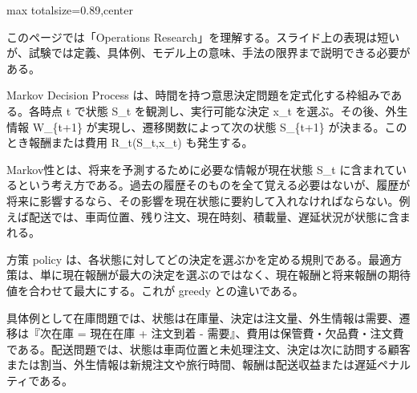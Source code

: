 \begin{minipage}[t]{0.58\textwidth}
\begin{adjustbox}{max totalsize={\textwidth}{0.89\textheight},center}
\begin{minipage}{\textwidth}\scriptsize
{}このページでは「Operations Research」を理解する。スライド上の表現は短いが、試験では定義、具体例、モデル上の意味、手法の限界まで説明できる必要がある。\par
Markov Decision Process は、時間を持つ意思決定問題を定式化する枠組みである。各時点 t で状態 S\_t を観測し、実行可能な決定 x\_t を選ぶ。その後、外生情報 W\_\{t+1\} が実現し、遷移関数によって次の状態 S\_\{t+1\} が決まる。このとき報酬または費用 R\_t(S\_t,x\_t) も発生する。\par
Markov性とは、将来を予測するために必要な情報が現在状態 S\_t に含まれているという考え方である。過去の履歴そのものを全て覚える必要はないが、履歴が将来に影響するなら、その影響を現在状態に要約して入れなければならない。例えば配送では、車両位置、残り注文、現在時刻、積載量、遅延状況が状態に含まれる。\par
方策 policy は、各状態に対してどの決定を選ぶかを定める規則である。最適方策は、単に現在報酬が最大の決定を選ぶのではなく、現在報酬と将来報酬の期待値を合わせて最大にする。これが greedy との違いである。\par
具体例として在庫問題では、状態は在庫量、決定は注文量、外生情報は需要、遷移は『次在庫 = 現在在庫 + 注文到着 - 需要』、費用は保管費・欠品費・注文費である。配送問題では、状態は車両位置と未処理注文、決定は次に訪問する顧客または割当、外生情報は新規注文や旅行時間、報酬は配送収益または遅延ペナルティである。\par

\end{minipage}
\end{adjustbox}
\end{minipage}
